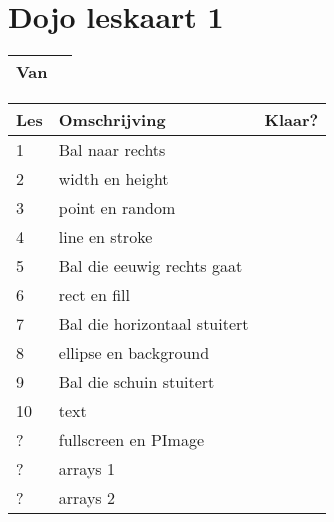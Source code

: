 \documentclass{article}
\begin{document}
\section{Dojo leskaart 1}

\begin{table}
  \centering 
  \begin{tabular}{l l}
    \hline
    Van &  \\
    \hline
  \end{tabular}
\end{table}


\begin{table}
  \centering 
  \begin{tabular}{l l l}
    \hline
    Les & Omschrijving & Klaar? \\
    \hline
    \hline
    1 & Bal naar rechts & \\
    2 & width en height & \\
    3 & point en random & \\
    4 & line en stroke & \\
    5 & Bal die eeuwig rechts gaat & \\
    6 & rect en fill & \\
    7 & Bal die horizontaal stuitert & \\
    8 & ellipse en background & \\
    9 & Bal die schuin stuitert & \\
    10 & text & \\
    ? & fullscreen en PImage & \\
    ? & arrays 1 & \\
    ? & arrays 2 & \\
    \hline
  \end{tabular}
\end{table}
\end{document}
